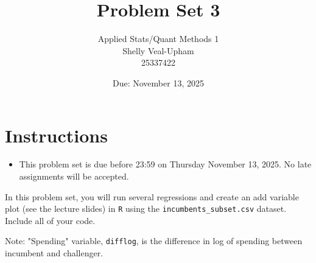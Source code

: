 \documentclass[12pt,letterpaper]{article}
\title{Problem Set 3}
\date{Due: November 13, 2025}
\author{Applied Stats/Quant Methods 1\\
	Shelly Veal-Upham\\
	25337422}
\begin{document}
	\maketitle
	\section*{Instructions}
	\begin{itemize}
	\item This problem set is due before 23:59 on Thursday November 13, 2025. No late assignments will be accepted.
	\end{itemize}

		\vspace{.25cm}
	
\noindent In this problem set, you will run several regressions and create an add variable plot (see the lecture slides) in \texttt{R} using the \texttt{incumbents\_subset.csv} dataset. Include all of your code.\\
\vspace{.2cm}

\indent * Note: "Spending" variable,  \texttt{difflog}, is the difference in log of spending between incumbent and challenger.

	\vspace{.2cm}
\end{document}

